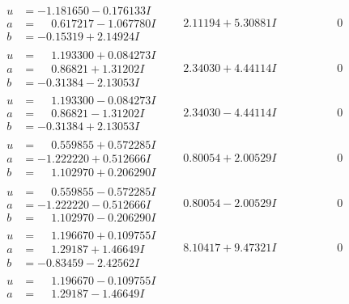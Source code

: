 \documentclass[1p]{elsarticle_modified}
\theoremstyle{definition}
\begin{document}
$$\begin{array}{c|c|c}
 \hline 
\begin{aligned}
u &= -1.181650 - 0.176133 I \\
a &= \phantom{-}0.617217 - 1.067780 I \\
b &= -0.15319 + 2.14924 I\end{aligned}
 & \phantom{-}2.11194 + 5.30881 I & \phantom{-0.000000 } 0 \\ \hline\begin{aligned}
u &= \phantom{-}1.193300 + 0.084273 I \\
a &= \phantom{-}0.86821 + 1.31202 I \\
b &= -0.31384 - 2.13053 I\end{aligned}
 & \phantom{-}2.34030 + 4.44114 I & \phantom{-0.000000 } 0 \\ \hline\begin{aligned}
u &= \phantom{-}1.193300 - 0.084273 I \\
a &= \phantom{-}0.86821 - 1.31202 I \\
b &= -0.31384 + 2.13053 I\end{aligned}
 & \phantom{-}2.34030 - 4.44114 I & \phantom{-0.000000 } 0 \\ \hline\begin{aligned}
u &= \phantom{-}0.559855 + 0.572285 I \\
a &= -1.222220 + 0.512666 I \\
b &= \phantom{-}1.102970 + 0.206290 I\end{aligned}
 & \phantom{-}0.80054 + 2.00529 I & \phantom{-0.000000 } 0 \\ \hline\begin{aligned}
u &= \phantom{-}0.559855 - 0.572285 I \\
a &= -1.222220 - 0.512666 I \\
b &= \phantom{-}1.102970 - 0.206290 I\end{aligned}
 & \phantom{-}0.80054 - 2.00529 I & \phantom{-0.000000 } 0 \\ \hline\begin{aligned}
u &= \phantom{-}1.196670 + 0.109755 I \\
a &= \phantom{-}1.29187 + 1.46649 I \\
b &= -0.83459 - 2.42562 I\end{aligned}
 & \phantom{-}8.10417 + 9.47321 I & \phantom{-0.000000 } 0 \\ \hline\begin{aligned}
u &= \phantom{-}1.196670 - 0.109755 I \\
a &= \phantom{-}1.29187 - 1.46649 I \\

\end{aligned}
\end{array}$$
\end{document}
